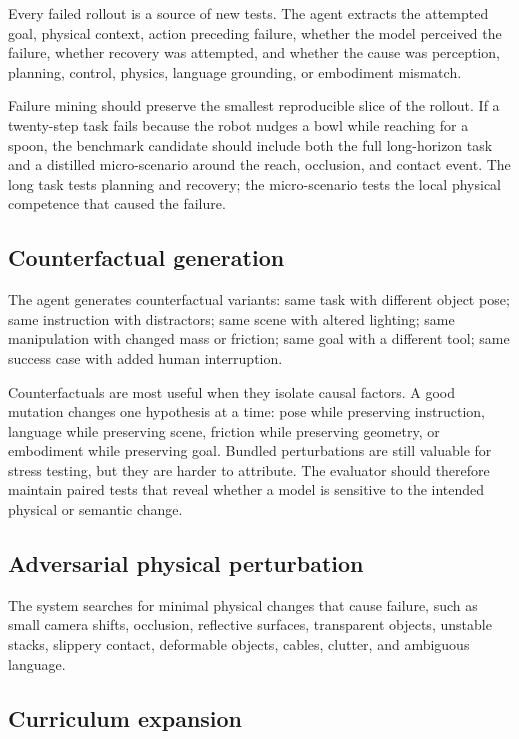 \documentclass[sigconf,review,anonymous]{acmart}
\begin{document}
Every failed rollout is a source of new tests. The agent extracts the attempted goal, physical context, action preceding failure, whether the model perceived the failure, whether recovery was attempted, and whether the cause was perception, planning, control, physics, language grounding, or embodiment mismatch.

Failure mining should preserve the smallest reproducible slice of the rollout. If a twenty-step task fails because the robot nudges a bowl while reaching for a spoon, the benchmark candidate should include both the full long-horizon task and a distilled micro-scenario around the reach, occlusion, and contact event. The long task tests planning and recovery; the micro-scenario tests the local physical competence that caused the failure.

\subsection{Counterfactual generation}

The agent generates counterfactual variants: same task with different object pose; same instruction with distractors; same scene with altered lighting; same manipulation with changed mass or friction; same goal with a different tool; same success case with added human interruption.

Counterfactuals are most useful when they isolate causal factors. A good mutation changes one hypothesis at a time: pose while preserving instruction, language while preserving scene, friction while preserving geometry, or embodiment while preserving goal. Bundled perturbations are still valuable for stress testing, but they are harder to attribute. The evaluator should therefore maintain paired tests that reveal whether a model is sensitive to the intended physical or semantic change.

\subsection{Adversarial physical perturbation}

The system searches for minimal physical changes that cause failure, such as small camera shifts, occlusion, reflective surfaces, transparent objects, unstable stacks, slippery contact, deformable objects, cables, clutter, and ambiguous language.

\subsection{Curriculum expansion}
\end{document}
